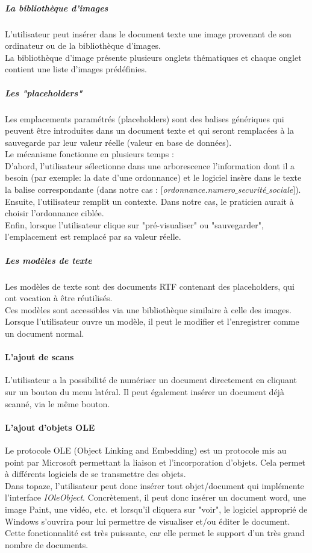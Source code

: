 \subparagraph*{La bibliothèque d'images}
L'utilisateur peut insérer dans le document texte une image provenant de son ordinateur ou de la bibliothèque d'images.\\
La bibliothèque d'image présente plusieurs onglets thématiques et chaque onglet contient une liste d'images prédéfinies.

\subparagraph*{Les "placeholders"}
Les emplacements paramétrés (placeholders) sont des balises génériques qui peuvent être introduites dans un document texte et qui seront remplacées à la sauvegarde par leur valeur réelle (valeur en base de données).\\

Le mécanisme fonctionne en plusieurs temps : \\
D'abord, l'utilisateur sélectionne dans une arborescence l'information dont il a besoin (par exemple: la date d'une ordonnance) et le logiciel insère dans le texte la balise correspondante (dans notre cas : \textit{$[$ordonnance.numero$\_$securité$\_$sociale$]$}). \\
Ensuite, l'utilisateur remplit un contexte. Dans notre cas, le praticien aurait à choisir l'ordonnance ciblée.\\
Enfin, lorsque l'utilisateur clique sur "pré-visualiser" ou "sauvegarder", l'emplacement est remplacé par sa valeur réelle.

\subparagraph*{Les modèles de texte}
Les modèles de texte sont des documents RTF contenant des placeholders, qui ont vocation à être réutilisés.\\
Ces modèles sont accessibles via une bibliothèque similaire à celle des images. 
Lorsque l'utilisateur ouvre un modèle, il peut le modifier et l'enregistrer comme un document normal. 

\paragraph*{L'ajout de scans \\}
L'utilisateur a la possibilité de numériser un document directement en cliquant sur un bouton du menu latéral. Il peut également insérer un document déjà scanné, via le même bouton.

\paragraph*{L'ajout d'objets OLE\\}
Le protocole OLE (Object Linking and Embedding) est un protocole mis au point par Microsoft permettant la liaison et l'incorporation d'objets. Cela permet à différents logiciels de se transmettre des objets. \\
Dans topaze, l'utilisateur peut donc insérer tout objet/document qui implémente l'interface \textit{IOleObject}. Concrètement, il peut donc insérer un document word, une image Paint, une vidéo, etc. et lorsqu'il cliquera sur "voir", le logiciel approprié de Windows s'ouvrira pour lui permettre de visualiser et/ou éditer le document.
Cette fonctionnalité est très puissante, car elle permet le support d'un très grand nombre de documents. 

